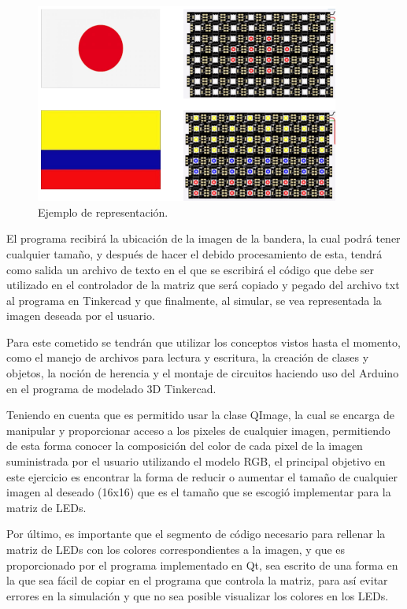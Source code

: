 \documentclass{article}
\begin{document}
\begin{figure}[h]
\includegraphics[width=10cm]{punto1banderas.png}
\centering
\caption{Ejemplo de representación.}
\label{fig:punto1}
\end{figure}

El programa recibirá la ubicación de la imagen de la bandera, la cual podrá tener cualquier tamaño, y después de hacer el debido procesamiento de esta, tendrá como salida un archivo de texto en el que se escribirá el código que debe ser utilizado en el controlador de la matriz que será copiado y pegado del archivo txt al programa en Tinkercad y que finalmente, al simular, se vea representada la imagen deseada por el usuario.

Para este cometido se tendrán que utilizar los conceptos vistos hasta el momento, como el manejo de archivos para lectura y escritura, la creación de clases y objetos, la noción de herencia y el montaje de circuitos haciendo uso del Arduino en el programa de modelado 3D Tinkercad.

Teniendo en cuenta que es permitido usar la clase QImage, la cual se encarga de manipular y proporcionar acceso a los pixeles de cualquier imagen, permitiendo de esta forma conocer la composición del color de cada pixel de la imagen suministrada por el usuario utilizando el modelo RGB, el principal objetivo en este ejercicio es encontrar la forma de reducir o aumentar el tamaño de cualquier imagen al deseado (16x16) que es el tamaño que se escogió implementar para la matriz de LEDs.

Por último, es importante que el segmento de código necesario para rellenar la matriz de LEDs con los colores correspondientes a la imagen, y que es proporcionado por el programa implementado en Qt, sea escrito de una forma en la que sea fácil de copiar en el programa que controla la matriz, para así evitar errores en la simulación y que no sea posible visualizar los colores en los LEDs.
\end{document}
